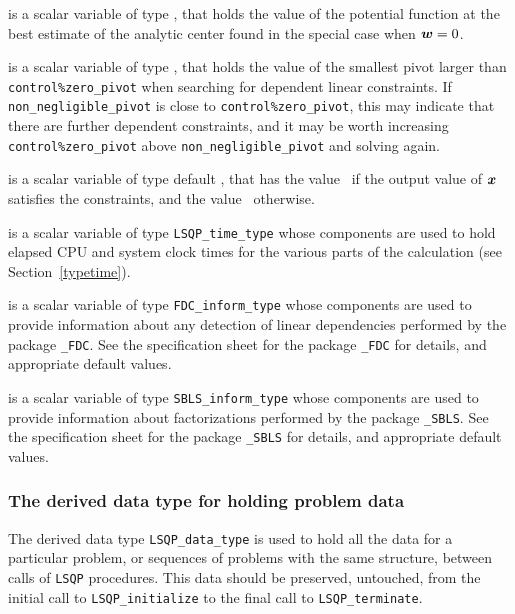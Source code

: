 \documentclass{galahad}
\newcommand{\packagename}{LSQP}
\begin{document}
\begin{description}
 is a scalar variable of type \realdp, that holds the
value of the potential function at the best estimate of the analytic center 
found in the special case when ${\bm{w}} = 0$.

 is a scalar variable of type \realdp, 
that holds the value of the smallest pivot larger than {\tt control\%zero\_pivot}
when searching for dependent linear constraints. If 
{\tt non\_negligible\_pivot} is close to  {\tt control\%zero\_pivot},
this may indicate that there are further dependent constraints, and
it may be worth increasing {\tt control\%zero\_pivot} above 
{\tt non\_negligible\_pivot} and solving again.

 is a scalar variable of type default \logical, that has the
value \true\ if the output value of ${\bm{x}}$ satisfies the constraints,
and the value \false\ otherwise.

 is a scalar variable of type {\tt \packagename\_time\_type} 
whose components are used to hold elapsed CPU  and system clock 
times for the various parts of the calculation
(see Section~\ref{typetime}).

 is a scalar variable of type 
{\tt FDC\_inform\_type}
whose components are used to provide information about 
any detection of linear dependencies
performed by the package 
{\tt \libraryname\_FDC}. 
See the specification sheet for the package 
{\tt \libraryname\_FDC} 
for details, and appropriate default values.

 is a scalar variable of type 
{\tt SBLS\_inform\_type}
whose components are used to provide information about factorizations
performed by the package 
{\tt \libraryname\_SBLS}. 
See the specification sheet for the package 
{\tt \libraryname\_SBLS} 
for details, and appropriate default values.

\end{description}


\subsubsection{The derived data type for holding problem data}\label{typedata}
The derived data type 
{\tt \packagename\_data\_type} 
is used to hold all the data for a particular problem,
or sequences of problems with the same structure, between calls of 
{\tt \packagename} procedures. 
This data should be preserved, untouched, from the initial call to 
{\tt \packagename\_initialize}
to the final call to
{\tt \packagename\_terminate}.
\end{document}

